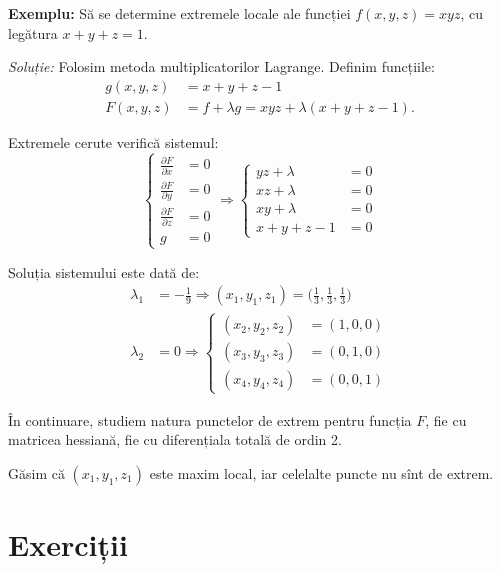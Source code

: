 \documentclass[11pt,a4paper]{article}
\theoremstyle{dotless}
\theoremstyle{dotlessdr}
\begin{document}
\textbf{Exemplu:} Să se determine extremele locale ale funcției $f(x,y,z) = xyz$,
cu legătura $x + y + z = 1$.

\emph{Soluție:} Folosim metoda multiplicatorilor Lagrange. Definim funcțiile:
\begin{align*}
  g(x, y, z) &= x + y + z - 1 \\
  F(x, y, z) &= f + \lambda g = xyz + \lambda(x + y + z - 1).
\end{align*}

Extremele cerute verifică sistemul:
\[
  \begin{cases}
    \frac{\partial F}{\partial x} &= 0 \\
    \frac{\partial F}{\partial y} &= 0 \\
    \frac{\partial F}{\partial z} &= 0 \\
    g &= 0
  \end{cases} \Rightarrow
  \begin{cases}
    yz + \lambda &= 0 \\
    xz + \lambda &= 0 \\
    xy + \lambda &= 0 \\
    x + y + z - 1 &= 0
  \end{cases}
\]

Soluția sistemului este dată de:
\begin{align*}
  \lambda_1 &= -\frac{1}{9} \Rightarrow %
              (x_1, y_1, z_1) = \big(\frac{1}{3}, \frac{1}{3}, \frac{1}{3}\big) \\
  \lambda_2 &= 0 \Rightarrow
              \begin{cases}
                (x_2, y_2, z_2) &= (1, 0, 0) \\
                (x_3, y_3, z_3) &= (0, 1, 0) \\
                (x_4, y_4, z_4) &= (0, 0, 1)
              \end{cases}
\end{align*}

În continuare, studiem natura punctelor de extrem pentru funcția $F$, fie cu
matricea hessiană, fie cu diferențiala totală de ordin 2.

Găsim că $(x_1, y_1, z_1)$ este maxim local, iar celelalte puncte nu sînt
de extrem.



\section{Exerciții}
\label{sec:exc}
\end{document}
